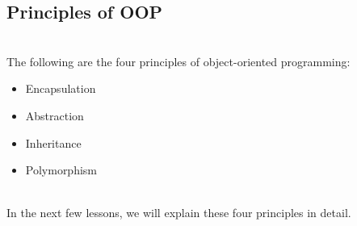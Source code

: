 \subsection{Principles of OOP}\label{PSdHLgXANdpN6aO6CG6cJ}
\\
The following are the four principles of object-oriented programming:

\begin{itemize}
\item
\protect{}\label{YfP29jG9J1DkAiMI7w5-1}
Encapsulation
\item
\protect{}\label{zxQgT31vDB6P4WAggCQm1}
Abstraction
\item
\protect{}\label{P1rHVVDbmABNB0VJuV_xs}
Inheritance
\item
\protect{}\label{blt9jcyzT3RDUM6nbvVEI}
Polymorphism
\end{itemize}
\\
In the next few lessons, we will explain these four principles in detail.

